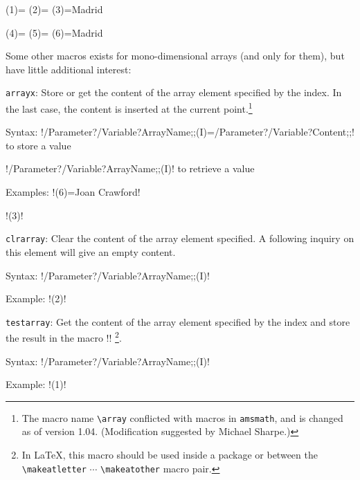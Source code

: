 \documentclass{article}
\newenvironment{Description}[1]{%
\begin{list}{nothing}{\setlength{\leftmargin}{#1}
\setlength{\labelwidth}{\leftmargin}\setlength{\labelsep}{1mm}}}
{\end{list}}
\newcommand{\BS}{\texttt{\symbol{`\\}}}
\newcommand{\Macro}[1]{\texttt{\BS#1}}
\newcommand{\FormatTeXMacro}[1]{\Macro{#1}\hfill :}
\begin{document}
\begin{SideBySideExample}[xrightmargin=6cm]
  \newarray\Data
  \newcount\CounterP            %
  \setcounter{CounterL}{3}
  \def\Town{Madrid}
  \Data(1)={\the\CounterP}
  \Data(2)={\the\value{CounterL}}
  \Data(3)={\Town}

  \expandarrayelementtrue
  \Data(4)={\the\CounterP}
  \Data(5)={\the\value{CounterL}}
  \Data(6)={\Town}

  \setcounter{CounterL}{5}
  \def\Town{Roma}

  \multido{\iData=1+1}{6}{%
    \BS\texttt{Data(\iData)}=`\Data(\iData)'\\}
\end{SideBySideExample}

\vspace{3mm}
\noindent Some other macros exists for mono-dimensional arrays (and only for
them), but have little additional interest:

\begin{Description}{4cm}
  \item[\FormatTeXMacro{arrayx}] Store or get the content of the array element
  specified by the index. In the last case, the content is inserted at the
  current point.\footnote{The macro name \verb|\array| conflicted with macros in {\tt amsmath}, and is changed as of version 1.04. (Modification suggested by Michael Sharpe.)}

       Syntax: !\arrayx/Parameter?/Variable?ArrayName;;(I)=/Parameter?/Variable?Content;;!
               to store a value

               \hspace{1.3cm}!\arrayx/Parameter?/Variable?ArrayName;;(I)! to retrieve a value

       Examples: !(6)={Joan Crawford}!

                 \hspace{1.75cm}!(3)!

  \item[\FormatTeXMacro{clrarray}] Clear the content of the array element specified.
  A following inquiry on this element will give an empty content.

       Syntax: !\clrarray/Parameter?/Variable?ArrayName;;(I)!

       Example: !(2)!

  \item[\FormatTeXMacro{testarray}]  Get the content of the array element specified
  by the index and store the result in the macro !\temp@macro!%
  \footnote{In \LaTeX, this macro should be used inside a package or between
  the \verb+\makeatletter+ $\cdots$ \verb+\makeatother+ macro pair.}.

       Syntax: !\testarray/Parameter?/Variable?ArrayName;;(I)!

       Example: !(1)!
\end{Description}
\end{document}

